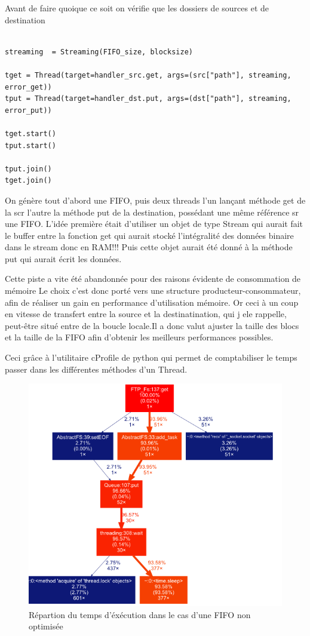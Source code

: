 Avant de faire quoique ce soit on vérifie que les dossiers de sources et de destination

\begin{verbatim}

streaming  = Streaming(FIFO_size, blocksize)

tget = Thread(target=handler_src.get, args=(src["path"], streaming, error_get))
tput = Thread(target=handler_dst.put, args=(dst["path"], streaming, error_put))

tget.start()
tput.start()

tput.join()
tget.join()

\end{verbatim}

On génère tout d'abord une FIFO, puis deux threads l'un lançant méthode get de la scr l'autre la méthode put de la destination, possédant une même référence sr une FIFO.
L'idée première était d'utiliser un objet de type Stream qui aurait fait le buffer entre la fonction get qui aurait stocké l'intégralité des données binaire dans le stream donc en RAM!!! Puis cette objet aurait été donné à la méthode put qui aurait écrit les données. 

Cette piste a vite été abandonnée pour des raisons évidente de consommation de mémoire 
Le choix c'est donc porté vers une structure producteur-consommateur, afin de réaliser un gain en performance d'utilisation mémoire. Or ceci à un coup en vitesse de transfert entre la source et la destinatination, qui j ele rappelle, peut-être situé entre de la boucle locale.Il a donc valut ajuster la taille des blocs et la taille de la FIFO afin d'obtenir les meilleurs performances possibles.

Ceci grâce à l'utilitaire cProfile de python qui permet de comptabiliser le temps passer dans les différentes méthodes d'un Thread.

\begin{figure}[h!]
	\centering
	\includegraphics[scale=0.4]{images/without_optimization}
	\caption{Répartion du temps d'éxécution dans le cas d'une FIFO non optimisée}
\end{figure}

